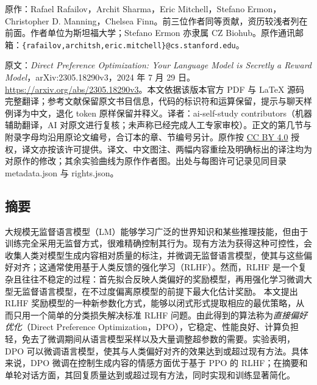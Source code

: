 \label{dpo-paper}
\noindent 原作：Rafael Rafailov，Archit Sharma，Eric Mitchell，Stefano Ermon，Christopher D. Manning，Chelsea Finn。前三位作者同等贡献，资历较浅者列在前面。作者单位为斯坦福大学；Stefano Ermon 亦隶属 CZ Biohub。原作通讯邮箱：\texttt{\{rafailov,architsh,eric.mitchell\}@cs.stanford.edu}。

\noindent 原文：\emph{Direct Preference Optimization: Your Language Model is Secretly a Reward Model}，arXiv:2305.18290v3，2024 年 7 月 29 日。\url{https://arxiv.org/abs/2305.18290v3}。本文依据该版本官方 PDF 与 LaTeX 源码完整翻译；参考文献保留原文书目信息，代码的标识符和运算保留，提示与聊天样例译为中文，退化 token 原样保留并释义。译者：ai-self-study contributors（机器辅助翻译，AI 对原文进行复核；未声称已经完成人工专家审校）。正文的第几节与附录字母均沿用原论文编号，合订本的章、节编号另计。原作按 \href{https://creativecommons.org/licenses/by/4.0/}{CC BY 4.0} 授权，译文亦按该许可提供。译文、中文图注、两幅内容重绘及明确标出的译注均为对原作的修改；其余实验曲线为原作作者图。出处与每图许可记录见同目录 metadata.json 与 rights.json。

\subsection*{摘要}\label{dpo-abstract}
大规模无监督语言模型（LM）能够学习广泛的世界知识和某些推理技能，但由于训练完全采用无监督方式，很难精确控制其行为。现有方法为获得这种可控性，会收集人类对模型生成内容相对质量的标注，并微调无监督语言模型，使其与这些偏好对齐；这通常使用基于人类反馈的强化学习（RLHF）。然而，RLHF 是一个复杂且往往不稳定的过程：首先拟合反映人类偏好的奖励模型，再用强化学习微调大型无监督语言模型，在不过度偏离原模型的前提下最大化估计奖励。
本文提出 RLHF 奖励模型的一种新参数化方式，能够以闭式形式提取相应的最优策略，从而只用一个简单的分类损失解决标准 RLHF 问题。由此得到的算法称为\emph{直接偏好优化}（Direct Preference Optimization，DPO），它稳定、性能良好、计算负担轻，免去了微调期间从语言模型采样以及大量调整超参数的需要。实验表明，DPO 可以微调语言模型，使其与人类偏好对齐的效果达到或超过现有方法。具体来说，DPO 微调在控制生成内容的情感方面优于基于 PPO 的 RLHF；在摘要和单轮对话方面，其回复质量达到或超过现有方法，同时实现和训练显著简化。


